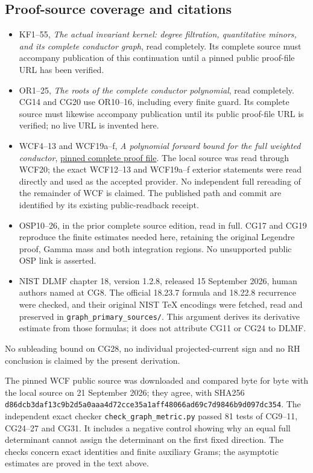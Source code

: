 \subsection{Proof-source coverage and citations}\label{proof-source-coverage-and-citations}

\begin{itemize}
\tightlist
\item
  KF1--55, \emph{The actual invariant kernel: degree filtration, quantitative minors, and its complete conductor graph}, read completely. Its complete source must accompany publication of this continuation until a pinned public proof-file URL has been verified.
\item
  OR1--25, \emph{The roots of the complete conductor polynomial}, read completely. CG14 and CG20 use OR10--16, including every finite guard. Its complete source must likewise accompany publication until its public proof-file URL is verified; no live URL is invented here.
\item
  WCF4--13 and WCF19a--f, \emph{A polynomial forward bound for the full weighted conductor}, \href{https://github.com/KokunoYumeto/zeta-function-research-reader/blob/52274804051e325c8a6ef69c17b3958cc2caba0a/workbenches/splitzero-tandem/continuations/20260920-gamma-and-finite-derivative/providers/WEIGHTED_CONDUCTOR_FORWARD.tex}{pinned complete proof file}. The local source was read through WCF20; the exact WCF12--13 and WCF19a--f exterior statements were read directly and used as the accepted provider. No independent full rereading of the remainder of WCF is claimed. The published path and commit are identified by its existing public-readback receipt.
\item
  OSP10--26, in the prior complete source edition, read in full. CG17 and CG19 reproduce the finite estimates needed here, retaining the original Legendre proof, Gamma mass and both integration regions. No unsupported public OSP link is asserted.
\item
  NIST DLMF chapter 18, version 1.2.8, released 15 September 2026, human authors named at CG8. The official 18.23.7 formula and 18.22.8 recurrence were checked, and their original NIST TeX encodings were fetched, read and preserved in \nolinkurl{graph_primary_sources/}. This argument derives its derivative estimate from those formulas; it does not attribute CG11 or CG24 to DLMF.
\end{itemize}

No subleading bound on CG28, no individual projected-current sign and no RH conclusion is claimed by the present derivation.

The pinned WCF public source was downloaded and compared byte for byte with the local source on 21 September 2026; they agree, with SHA256 \nolinkurl{d86dcb3daf13c9b2d5a0aaa4d72cce35a1aff48066ad69c7d9846b9d097dc354}. The independent exact checker \nolinkurl{check_graph_metric.py} passed 81 tests of CG9--11, CG24--27 and CG31. It includes a negative control showing why an equal full determinant cannot assign the determinant on the first fixed direction. The checks concern exact identities and finite auxiliary Grams; the asymptotic estimates are proved in the text above.

